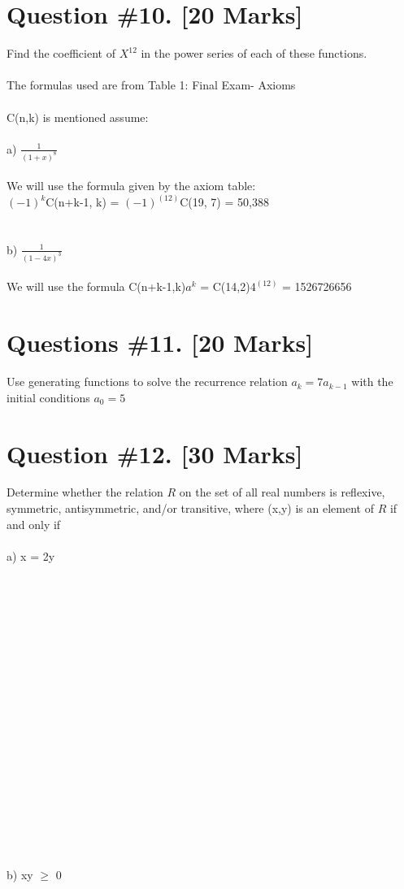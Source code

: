 \documentclass{article}
\begin{document}
\section{Question \#10. [20 Marks]}
Find the coefficient of $X^{12}$ in the power series of each of these functions.  \\\\
The formulas used are from Table 1: Final Exam- Axioms \\\\
C(n,k) is mentioned assume: 
 \equation{}
 \equation{}\\\\
a) $\frac{1}{(1+x)^8}$ \\\\
We will use the formula given by the axiom table: \\ 
$(-1)^k$C(n+k-1, k) = $(-1)^{(12)}$C(19, 7) = 50,388 \\
 \\\\
b) $\frac{1}{(1-4x)^3}$ \\\\
We will use the formula C(n+k-1,k)$a^k$ = C(14,2)$4^{(12)}$ = 1526726656
\newpage
\section{Questions \#11. [20 Marks]} 
Use generating functions to solve the recurrence relation $a_{k} = 7a_{k-1}$ with the initial conditions $a_{0} = 5$
\newpage
\section{Question \#12. [30 Marks]}
Determine whether the relation $R$ on the set of all real numbers is reflexive, symmetric, antisymmetric, and/or transitive, where (x,y) is an element of $R$ if and only if \\\\
a) x = 2y \\\\\\\\\\\\\\\\\\\\\\\\\\\\\\\\\\\\\\\\
b) xy $\geq$ 0
\end{document}
